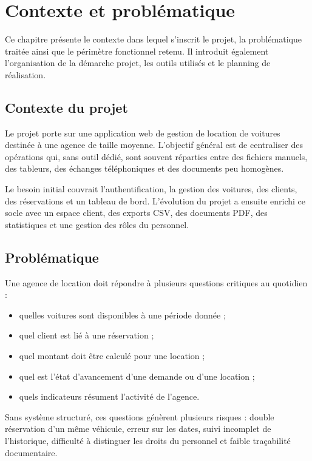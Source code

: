 \chapter{Contexte et problématique}

Ce chapitre présente le contexte dans lequel s'inscrit le projet, la problématique traitée ainsi que le périmètre fonctionnel retenu. Il introduit également l'organisation de la démarche projet, les outils utilisés et le planning de réalisation.

\section{Contexte du projet}
Le projet porte sur une application web de gestion de location de voitures destinée à une agence de taille moyenne. L'objectif général est de centraliser des opérations qui, sans outil dédié, sont souvent réparties entre des fichiers manuels, des tableurs, des échanges téléphoniques et des documents peu homogènes.

Le besoin initial couvrait l'authentification, la gestion des voitures, des clients, des réservations et un tableau de bord. L'évolution du projet a ensuite enrichi ce socle avec un espace client, des exports CSV, des documents PDF, des statistiques et une gestion des rôles du personnel.

\section{Problématique}
Une agence de location doit répondre à plusieurs questions critiques au quotidien :
\begin{itemize}
  \item quelles voitures sont disponibles à une période donnée ;
  \item quel client est lié à une réservation ;
  \item quel montant doit être calculé pour une location ;
  \item quel est l'état d'avancement d'une demande ou d'une location ;
  \item quels indicateurs résument l'activité de l'agence.
\end{itemize}

Sans système structuré, ces questions génèrent plusieurs risques : double réservation d'un même véhicule, erreur sur les dates, suivi incomplet de l'historique, difficulté à distinguer les droits du personnel et faible traçabilité documentaire.

